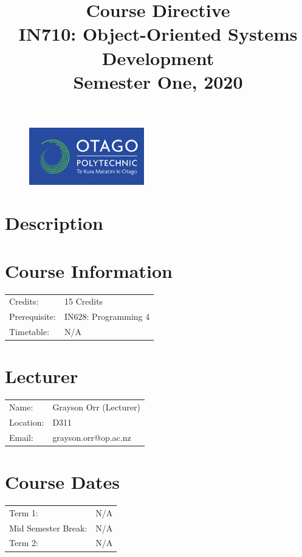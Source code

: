 \documentclass{article}
\author{}
\begin{document}
\begin{figure}
	\includegraphics[width=50mm]{../../resources/img/logo.png}
\end{figure}

\title{Course Directive\\IN710: Object-Oriented Systems Development\\Semester One, 2020}
\date{}
\maketitle

\section*{Description}

\section*{Course Information}
\begin{tabular}{ll}
	Credits:      & 15 Credits           \\
	Prerequisite: & IN628: Programming 4 \\
	Timetable:    & N/A                  \\
\end{tabular}

\section*{Lecturer}
\begin{tabular}{ll}
	Name:     & Grayson Orr (Lecturer) \\
	Location: & D311                   \\
	Email:    & grayson.orr@op.ac.nz   \\
\end{tabular}

\section*{Course Dates}
\begin{tabular}{ll}
	Term 1:             & N/A \\
	Mid Semester Break: & N/A \\
	Term 2:             & N/A \\
\end{tabular}
\end{document}
